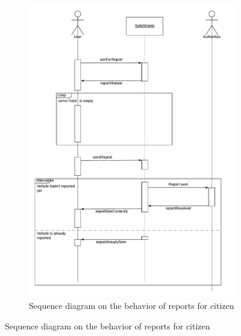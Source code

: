 \documentclass[12pt,a4paper]{report}
\begin{document}
				\begin{figure}[H]
					\begin{subfigure}{\textwidth}
						\includegraphics[scale = 0.75, center]{ReportSequenceDiagram}
						\caption{Sequence diagram on the behavior of reports for citizen}
					\end{subfigure}
				\end{figure}
\end{document}
